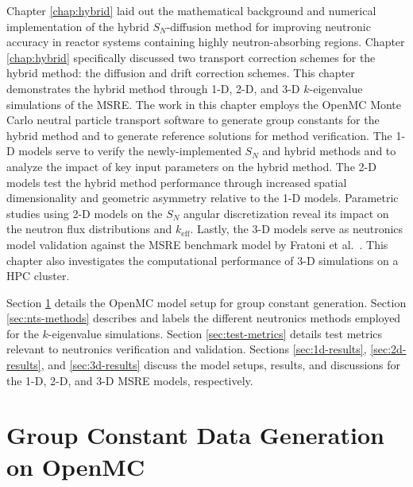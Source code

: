 Chapter \ref{chap:hybrid} laid out the mathematical background and numerical implementation
of the hybrid $S_N$-diffusion method for improving neutronic accuracy in reactor systems containing
highly neutron-absorbing regions. Chapter \ref{chap:hybrid} specifically discussed two transport
correction schemes for the hybrid method: the diffusion and drift correction
schemes. This chapter demonstrates the hybrid method through 1-D, 2-D, and 3-D $k$-eigenvalue
simulations of the \gls{MSRE}. The work in this chapter employs the OpenMC Monte Carlo neutral
particle transport software \cite{romano_openmc:_2015} to generate group constants for the hybrid
method and to generate reference solutions for method verification.
The 1-D models serve to verify the newly-implemented $S_N$ and hybrid methods
and to analyze the impact of key input parameters on the hybrid method. The
2-D models test the hybrid method performance through increased spatial dimensionality and
geometric asymmetry relative to the 1-D models. Parametric studies using 2-D models on the $S_N$ angular
discretization reveal its impact on the neutron flux distributions and $k_\text{eff}$.
Lastly, the 3-D models serve as neutronics model
validation against the \gls{MSRE} benchmark model by Fratoni et al.\ \cite{fratoni_molten_2020}.
This chapter also investigates the computational performance of 3-D simulations on a \gls{HPC}
cluster.

Section \ref{sec:msre-gc} details the OpenMC model setup for group constant generation. Section
\ref{sec:nts-methods} describes and labels the different neutronics methods employed for the
$k$-eigenvalue simulations. Section \ref{sec:test-metrics} details test metrics relevant to
neutronics verification and validation. Sections \ref{sec:1d-results}, \ref{sec:2d-results}, and
\ref{sec:3d-results} discuss the model setups, results, and discussions for the 1-D, 2-D, and 3-D
\gls{MSRE} models, respectively.

\section{Group Constant Data Generation on OpenMC} \label{sec:msre-gc}

